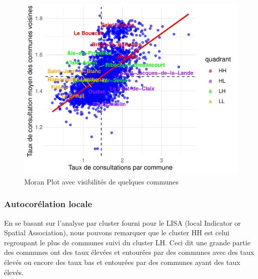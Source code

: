 \documentclass[
]{article}
\begin{document}
\begin{figure}

{\centering \includegraphics{rapport_intermediaire_files/figure-latex/unnamed-chunk-32-1} 

}

\caption{Moran Plot avec visibilités de quelques communes}\label{fig:unnamed-chunk-32}
\end{figure}

\hypertarget{autocoruxe9lation-locale}{%
\subsubsection{Autocorélation locale}\label{autocoruxe9lation-locale}}

En se basant sur l'analyse par cluster fourni pour le LISA (local
Indicator or Spatial Association), nous pouvons remarquer que le cluster
HH est celui regroupant le plus de communes suivi du cluster LH. Ceci
dit une grande partie des communes ont des taux élevées et entourées par
des communes avec des taux élevés ou encore des taux bas et entourées
par des communes ayant des taux élevés.
\end{document}
